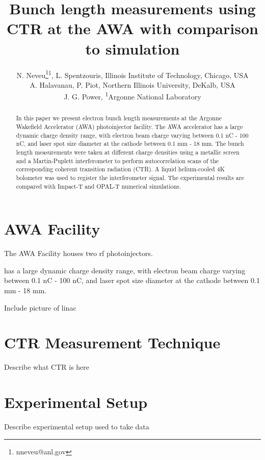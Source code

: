 \documentclass[letterpaper,  %
              ]{jacow-2_3}   %
\begin{document}
\title{Bunch length measurements using CTR at the AWA with comparison to simulation}

\author{N. Neveu\thanks{nneveu@anl.gov}\textsuperscript{1}, 
	    L. Spentzouris, Illinois Institute of Technology, Chicago, USA \\
		A. Halavanau, P. Piot, Northern Illinois University, DeKalb, USA \\
	    J. G. Power, \textsuperscript{1}Argonne National Laboratory}
\maketitle

%
\begin{abstract}
In this paper we present electron bunch length measurements 
at the Argonne Wakefield Accelerator (AWA) photoinjector facility. 
The AWA accelerator has a large dynamic charge density range, 
with electron beam charge varying between 0.1 nC - 100 nC, 
and laser spot size diameter at the cathode between 0.1 mm - 18 mm. 
The bunch length measurements were taken at different charge densities 
using a metallic screen and a Martin-Puplett interferometer to perform 
autocorrelation scans of the corresponding coherent transition radiation (CTR). 
A liquid helium-cooled 4K bolometer was used to register the interferometer signal. 
The experimental results are compared with Impact-T and OPAL-T numerical simulations.
\end{abstract}


\section{AWA Facility}
The AWA Facility houses two rf photoinjectors. 


 has a large dynamic charge density range, 
with electron beam charge varying between 0.1 nC - 100 nC, 
and laser spot size diameter at the cathode between 0.1 mm - 18 mm. 

Include picture of linac 


\section{CTR Measurement Technique}
Describe what CTR is here


\section{Experimental Setup}
Describe experimental setup used to take data
\end{document}
